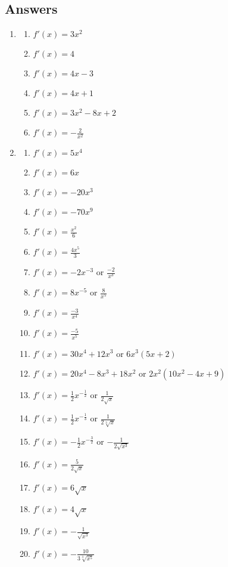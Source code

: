 \documentclass[a4paper,12pt]{article}
\begin{document}
\subsection*{Answers}

\begin{enumerate}
\item
    \begin{multicols}{2}
    \begin{enumerate}
    \item $f'(x) = 3x^2$
    \item $f'(x) = 4$
    \item $f'(x) = 4x - 3$
    \item $f'(x) = 4x + 1$
    \item $f'(x) = 3x^2 - 8x + 2$
    \item $f'(x) = -\frac{2}{x^2}$
    \end{enumerate}
    \end{multicols}

\item
    \begin{multicols}{2}
    \begin{enumerate}
    \item $f'(x) = 5x^4$
    \item $f'(x) = 6x$
    \item $f'(x) = -20x^3$
    \item $f'(x) = -70x^9$
    \item $f'(x) = \frac{x^2}{6}$
    \item $f'(x) = \frac{4x^5}{3}$
    \item $f'(x) = -2x^{-3}$ or $\frac{-2}{x^3}$
    \item $f'(x) = 8x^{-5}$ or $\frac{8}{x^5}$
    \item $f'(x) = \frac{-3}{x^4}$
    \item $f'(x) = \frac{-5}{x^5}$
    \item $f'(x) = 30x^4 + 12x^3$ or $6x^3(5x + 2)$
    \item $f'(x) = 20x^4 - 8x^3 + 18x^2$ or $2x^2(10x^2 - 4x + 9)$
    \item $f'(x) = \frac{1}{2}x^{-\frac{1}{2}}$ or $\frac{1}{2\sqrt{x}}$
    \item $f'(x) = \frac{1}{2}x^{-\frac{1}{3}}$ or $\frac{1}{2\sqrt[3]{x}}$
    \item $f'(x) = -\frac{1}{2}x^{-\frac{3}{2}}$ or $-\frac{1}{2\sqrt{x^3}}$
    \item $f'(x) = \frac{5}{2\sqrt{x}}$
    \item $f'(x) = 6\sqrt{x}$
    \item $f'(x) = 4\sqrt{x}$
    \item $f'(x) = -\frac{1}{\sqrt{x^3}}$
    \item $f'(x) = -\frac{10}{3\sqrt[3]{x^5}}$
    \end{enumerate}
    \end{multicols}

\end{enumerate}
\end{document}
